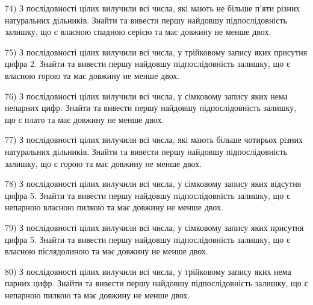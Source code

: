\documentclass[11pt, ukrainian]{article}
\begin{document}
\par
\vspace{0.9cm}
74) \space 
З послідовності цілих вилучили всі числа, які мають не більше п'яти різних натуральних дільників. Знайти та вивести першу найдовшу підпослідовність залишку, що є власною спадною серією та має довжину не менше двох.

\par
\vspace{0.9cm}
75) \space 
З послідовності цілих вилучили всі числа, у трійковому запису яких присутня цифра 2. Знайти та вивести першу найдовшу підпослідовність залишку, що є власною горою та має довжину не менше двох.

\par
\vspace{0.9cm}
76) \space 
З послідовності цілих вилучили всі числа, у сімковому запису яких нема непарних цифр. Знайти та вивести першу найдовшу підпослідовність залишку, що є плато та має довжину не менше двох.

\par
\vspace{0.9cm}
77) \space 
З послідовності цілих вилучили всі числа, які мають більше чотирьох різних натуральних дільників. Знайти та вивести першу найдовшу підпослідовність залишку, що є горою та має довжину не менше двох.

\par
\vspace{0.9cm}
78) \space 
З послідовності цілих вилучили всі числа, у сімковому запису яких відсутня цифра 5. Знайти та вивести першу найдовшу підпослідовність залишку, що є непарною власною пилкою та має довжину не менше двох.

\par
\vspace{0.9cm}
79) \space 
З послідовності цілих вилучили всі числа, у сімковому запису яких присутня цифра 5. Знайти та вивести першу найдовшу підпослідовність залишку, що є власною післядолиною та має довжину не менше двох.

\par
\vspace{0.9cm}
80) \space 
З послідовності цілих вилучили всі числа, у трійковому запису яких нема парних цифр. Знайти та вивести першу найдовшу підпослідовність залишку, що є непарною пилкою та має довжину не менше двох.
\end{document}
